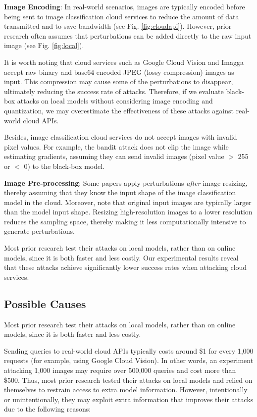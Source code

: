\textbf{Image Encoding}: In real-world scenarios, images are typically encoded before being sent to image classification cloud services to reduce the amount of data transmitted and to save bandwidth (see Fig. \ref{fig:cloudapi}). However, prior research often assumes that perturbations can be added directly to the raw input image (see Fig. \ref{fig:local}). 

It is worth noting that cloud services such as Google Cloud Vision and Imagga accept raw binary and base64 encoded JPEG (lossy compression) images as input. This compression may cause some of the perturbations to disappear, ultimately reducing the success rate of attacks. Therefore, if we evaluate black-box attacks on local models without considering image encoding and quantization, we may overestimate the effectiveness of these attacks against real-world cloud APIs.

Besides, image classification cloud services do not accept images with invalid pixel values. For example, the bandit attack does not clip the image while estimating gradients, assuming they can send invalid images (pixel value $>$ 255 or $<$ 0) to the black-box model.

\textbf{Image Pre-processing}: Some papers apply perturbations \emph{after} image resizing, thereby assuming that they know the input shape of the image classification model in the cloud. Moreover, note that original input images are typically larger than the model input shape. Resizing high-resolution images to a lower resolution reduces the sampling space, thereby making it less computationally intensive to generate perturbations. 

Most prior research test their attacks on local models, rather than on online models, since it is both faster and less costly. Our experimental results reveal that these attacks achieve significantly lower success rates when attacking cloud services.

\subsection{Possible Causes}

Most prior research test their attacks on local models, rather than on online models, since it is both faster and less costly.  

Sending queries to real-world cloud APIs typically costs around \$1 for every 1,000 requests (for example, using Google Cloud Vision). In other words, an experiment attacking 1,000 images may require over 500,000 queries and cost more than \$500. Thus, most prior research tested their attacks on local models and relied on themselves to restrain access to extra model information. However, intentionally or unintentionally, they may exploit extra information that improves their attacks due to the following reasons:

